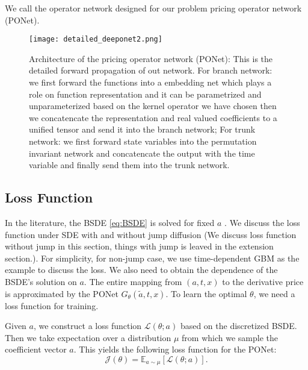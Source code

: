 \documentclass[11pt,a4paper]{article}
\theoremstyle{remark}
\begin{document}
	We call the operator network designed for our problem pricing operator network (PONet).
	
	\begin{figure}[htbp!]
		\centering
		\texttt{[image: detailed\_deeponet2.png]}
		\caption{Architecture of the pricing operator network (PONet): This is the detailed forward propagation of out network. For branch network: we first forward the functions into a embedding net which plays a role on function representation and it can be parametrized and unparameterized based on the kernel operator we have chosen then we concatencate the representation and real valued coefficients to a unified tensor and send it into the branch network; For trunk network: we first forward state variables into the permutation invariant network and concatencate the output with the time variable and finally send them into the trunk network.}
		\label{fig:detailed_deeponet}
	\end{figure}
	
	\subsection{Loss Function}
	
	In the literature, the BSDE \eqref{eq:BSDE} is solved for fixed $a$ . We discuss the loss function under SDE with and without jump diffusion (We discuss loss function without jump in this section, things with jump is leaved in the extension section.). For simplicity, for non-jump case, we use time-dependent GBM as the example to discuss the loss. We also need to obtain the dependence of the BSDE's solution on $a$. The entire mapping from $(a,t,x)$ to the derivative price is approximated by the PONet $G_{\theta}(\tilde{a},t,x)$. To learn the optimal $\theta$, we need a loss function for training. 
	
	Given $a$, we construct a loss function $\mathcal{L}(\theta;a)$ based on the discretized BSDE. Then we take expectation over a distribution $\mu$ from which we sample the coefficient vector $a$. This yields the following loss function for the PONet:
	\begin{equation}
		\mathcal{J}(\theta)=\mathbb{E}_{a \sim \mu}\left[\mathcal{L}(\theta;a)\right].
	\end{equation}   
	
\end{document}
